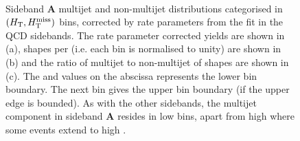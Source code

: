 \begin{figure}[!h]
  \centering
   \\
  \caption{Sideband \textbf{A} multijet and non-multijet distributions
    categorised in $(\mbox{$H_\text{T}$}, \mbox{$H_{\rm T}^{\rm miss}$})$ bins, corrected by rate parameters
    from the fit in the QCD sidebands. The rate parameter corrected yields
    are shown in (a), \HTmiss shapes per \scalht (i.e. each \scalht bin is normalised
    to unity) are shown in (b) and the ratio of multijet to non-multijet of
    \HTmiss shapes are shown in (c). The \scalht and \HTmiss values on the
    abscissa represents the lower bin boundary. The next bin gives the upper
    bin boundary (if the upper edge is bounded). As with the other sidebands,
    the multijet component in sideband \textbf{A} resides in low \HTmiss
    bins, apart from high \scalht where some events extend to high \HTmiss.}
  \label{fig:qcd_mht_shapes_doublesb}
\end{figure}
